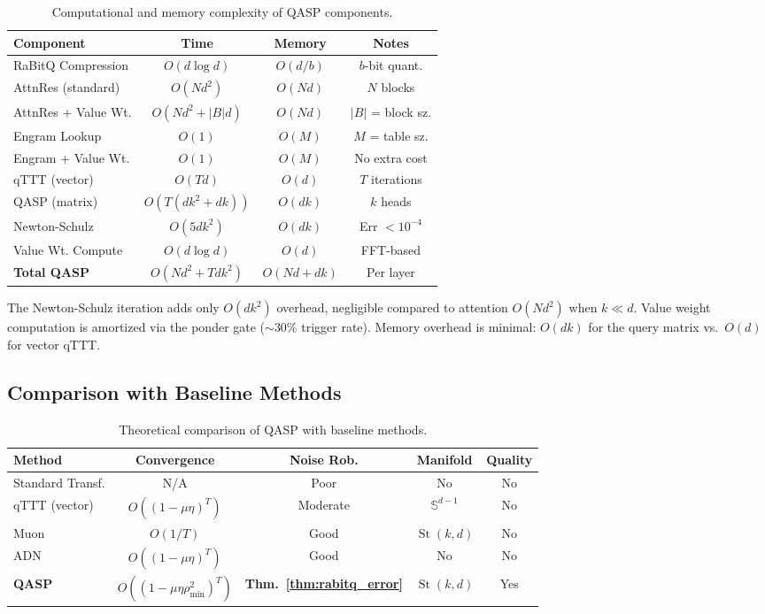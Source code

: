 \documentclass[twocolumn]{article}
\DeclareMathOperator{\St}{St}
\begin{document}
\begin{table}[htbp]
\centering
\caption{Computational and memory complexity of QASP components.}
\label{tab:complexity}
\begin{tabular}{@{}lccc@{}}
\toprule
\textbf{Component} & \textbf{Time} & \textbf{Memory} & \textbf{Notes} \\
\midrule
RaBitQ Compression & $O(d \log d)$ & $O(d/b)$ & $b$-bit quant. \\
AttnRes (standard) & $O(Nd^2)$ & $O(Nd)$ & $N$ blocks \\
AttnRes + Value Wt. & $O(Nd^2 + |B|d)$ & $O(Nd)$ & $|B|$ = block sz. \\
Engram Lookup & $O(1)$ & $O(M)$ & $M$ = table sz. \\
Engram + Value Wt. & $O(1)$ & $O(M)$ & No extra cost \\
qTTT (vector) & $O(Td)$ & $O(d)$ & $T$ iterations \\
QASP (matrix) & $O(T(dk^2 + dk))$ & $O(dk)$ & $k$ heads \\
Newton-Schulz & $O(5dk^2)$ & $O(dk)$ & Err $< 10^{-4}$ \\
Value Wt. Compute & $O(d \log d)$ & $O(d)$ & FFT-based \\
\midrule
\textbf{Total QASP} & $O(Nd^2 + Tdk^2)$ & $O(Nd + dk)$ & Per layer \\
\bottomrule
\end{tabular}
\end{table}

The Newton-Schulz iteration adds only $O(dk^2)$ overhead, negligible compared to attention $O(Nd^2)$ when $k \ll d$. Value weight computation is amortized via the ponder gate ($\sim$30\% trigger rate). Memory overhead is minimal: $O(dk)$ for the query matrix vs.\ $O(d)$ for vector qTTT.

\subsection{Comparison with Baseline Methods}

\begin{table}[htbp]
\centering
\caption{Theoretical comparison of QASP with baseline methods.}
\label{tab:theory_comparison}
\begin{tabular}{@{}lcccc@{}}
\toprule
\textbf{Method} & \textbf{Convergence} & \textbf{Noise Rob.} & \textbf{Manifold} & \textbf{Quality} \\
\midrule
Standard Transf. & N/A & Poor & No & No \\
qTTT (vector) & $O((1{-}\mu\eta)^T)$ & Moderate & $\mathbb{S}^{d-1}$ & No \\
Muon & $O(1/T)$ & Good & $\St(k,d)$ & No \\
ADN & $O((1{-}\mu\eta)^T)$ & Good & No & No \\
\textbf{QASP} & $O((1{-}\mu\eta\rho_{\min}^2)^T)$ & \textbf{Thm.~\ref{thm:rabitq_error}} & $\St(k,d)$ & Yes \\
\bottomrule
\end{tabular}
\end{table}
\end{document}
